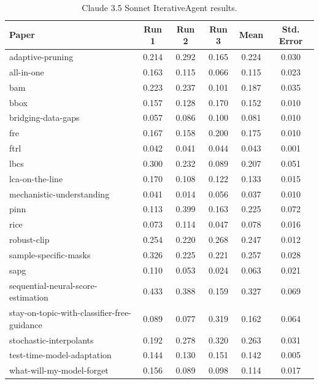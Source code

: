 \documentclass{article}
\theoremstyle{plain}
\theoremstyle{definition}
\theoremstyle{remark}
\begin{document}
\begin{table}[tb]
\caption{Claude 3.5 Sonnet IterativeAgent results.}
\label{tab:claude-results-iterative}
\vskip 0.15in
\begin{center}
\begin{small}
\begin{sc}
\begin{tabular}{l c c c c c}
\toprule
\textbf{Paper} & \textbf{Run 1} & \textbf{Run 2} & \textbf{Run 3} & \textbf{Mean} & \textbf{Std. Error} \\
\midrule
adaptive-pruning & 0.214 & 0.292 & 0.165 & 0.224 & 0.030 \\
all-in-one & 0.163 & 0.115 & 0.066 & 0.115 & 0.023 \\
bam & 0.223 & 0.237 & 0.101 & 0.187 & 0.035 \\
bbox & 0.157 & 0.128 & 0.170 & 0.152 & 0.010 \\
bridging-data-gaps & 0.057 & 0.086 & 0.100 & 0.081 & 0.010 \\
fre & 0.167 & 0.158 & 0.200 & 0.175 & 0.010 \\
ftrl & 0.042 & 0.041 & 0.044 & 0.043 & 0.001 \\
lbcs & 0.300 & 0.232 & 0.089 & 0.207 & 0.051 \\
lca-on-the-line & 0.170 & 0.108 & 0.122 & 0.133 & 0.015 \\
mechanistic-understanding & 0.041 & 0.014 & 0.056 & 0.037 & 0.010 \\
pinn & 0.113 & 0.399 & 0.163 & 0.225 & 0.072 \\
rice & 0.073 & 0.114 & 0.047 & 0.078 & 0.016 \\
robust-clip & 0.254 & 0.220 & 0.268 & 0.247 & 0.012 \\
sample-specific-masks & 0.326 & 0.225 & 0.221 & 0.257 & 0.028 \\
sapg & 0.110 & 0.053 & 0.024 & 0.063 & 0.021 \\
sequential-neural-score-estimation & 0.433 & 0.388 & 0.159 & 0.327 & 0.069 \\
stay-on-topic-with-classifier-free-guidance & 0.089 & 0.077 & 0.319 & 0.162 & 0.064 \\
stochastic-interpolants & 0.192 & 0.278 & 0.320 & 0.263 & 0.031 \\
test-time-model-adaptation & 0.144 & 0.130 & 0.151 & 0.142 & 0.005 \\
what-will-my-model-forget & 0.156 & 0.089 & 0.098 & 0.114 & 0.017 \\
\bottomrule
\end{tabular}
\end{sc}
\end{small}
\end{center}
\vskip -0.1in
\end{table}
\end{document}
